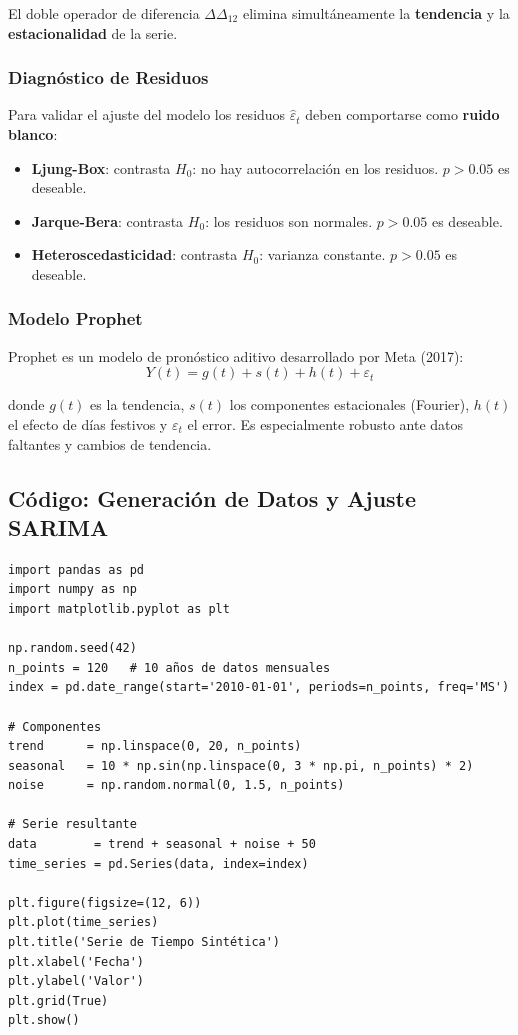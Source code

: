 \documentclass[12pt, a4paper]{article}
\begin{document}
El doble operador de diferencia $\Delta\Delta_{12}$ elimina simultáneamente
la \textbf{tendencia} y la \textbf{estacionalidad} de la serie.

\subsubsection{Diagnóstico de Residuos}

Para validar el ajuste del modelo los residuos $\hat{\varepsilon}_t$ deben
comportarse como \textbf{ruido blanco}:

\begin{itemize}[noitemsep]
  \item \textbf{Ljung-Box}: contrasta $H_0$: no hay autocorrelación en los
        residuos. $p > 0.05$ es deseable.
  \item \textbf{Jarque-Bera}: contrasta $H_0$: los residuos son normales.
        $p > 0.05$ es deseable.
  \item \textbf{Heteroscedasticidad}: contrasta $H_0$: varianza constante.
        $p > 0.05$ es deseable.
\end{itemize}

\subsubsection{Modelo Prophet}

Prophet es un modelo de pronóstico aditivo desarrollado por Meta (2017):
\[
  Y(t) = g(t) + s(t) + h(t) + \varepsilon_t
\]

donde $g(t)$ es la tendencia, $s(t)$ los componentes estacionales (Fourier),
$h(t)$ el efecto de días festivos y $\varepsilon_t$ el error. Es especialmente
robusto ante datos faltantes y cambios de tendencia.

\subsection{Código: Generación de Datos y Ajuste SARIMA}

\begin{lstlisting}[caption={Generación de la serie sintética}]
import pandas as pd
import numpy as np
import matplotlib.pyplot as plt

np.random.seed(42)
n_points = 120   # 10 años de datos mensuales
index = pd.date_range(start='2010-01-01', periods=n_points, freq='MS')

# Componentes
trend      = np.linspace(0, 20, n_points)
seasonal   = 10 * np.sin(np.linspace(0, 3 * np.pi, n_points) * 2)
noise      = np.random.normal(0, 1.5, n_points)

# Serie resultante
data        = trend + seasonal + noise + 50
time_series = pd.Series(data, index=index)

plt.figure(figsize=(12, 6))
plt.plot(time_series)
plt.title('Serie de Tiempo Sintética')
plt.xlabel('Fecha')
plt.ylabel('Valor')
plt.grid(True)
plt.show()
\end{lstlisting}
\end{document}
